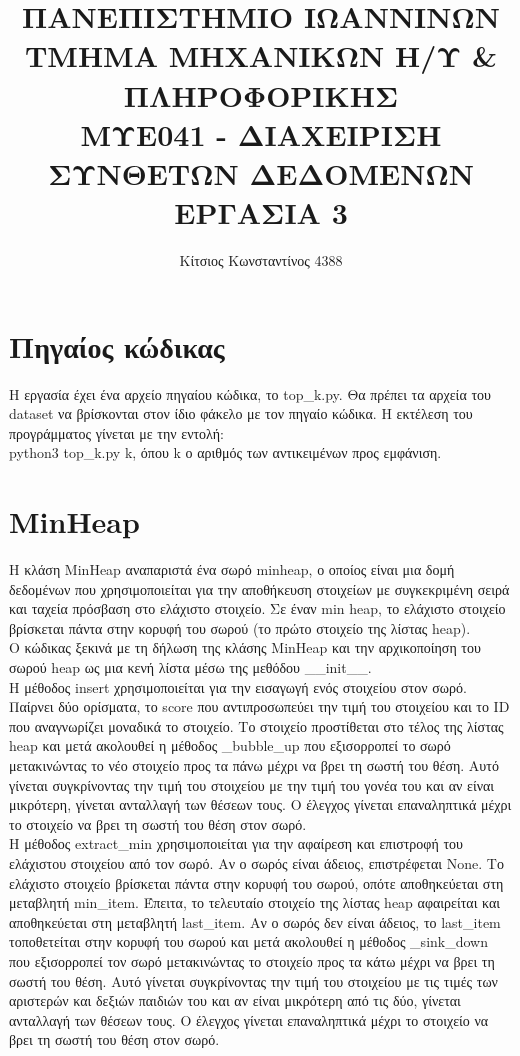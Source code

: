 \documentclass{article}[40pt]
\title{ΠΑΝΕΠΙΣΤΗΜΙΟ ΙΩΑΝΝΙΝΩΝ \\ ΤΜΗΜΑ ΜΗΧΑΝΙΚΩΝ Η/Υ  \&  ΠΛΗΡΟΦΟΡΙΚΗΣ \\  ΜΥΕ041 - ΔΙΑΧΕΙΡΙΣΗ ΣΥΝΘΕΤΩΝ ΔΕΔΟΜΕΝΩΝ \\ ΕΡΓΑΣΙΑ 3}
\author{Κίτσιος Κωνσταντίνος 4388 }
\begin{document}
\maketitle
\newpage
\tableofcontents
\newpage
\section{Πηγαίος κώδικας}
Η εργασία έχει ένα αρχείο πηγαίου κώδικα, το top\_k.py. Θα πρέπει τα αρχεία του dataset να βρίσκονται στον ίδιο φάκελο με τον πηγαίο κώδικα. Η εκτέλεση του προγράμματος γίνεται με την εντολή:\\
python3 top\_k.py k, όπου k ο αριθμός των αντικειμένων προς εμφάνιση.   
\section{MinHeap}
Η κλάση MinHeap αναπαριστά ένα σωρό minheap, ο οποίος είναι μια δομή δεδομένων που χρησιμοποιείται για την αποθήκευση στοιχείων με συγκεκριμένη σειρά και ταχεία πρόσβαση στο ελάχιστο στοιχείο. Σε έναν min heap, το ελάχιστο στοιχείο βρίσκεται πάντα στην κορυφή του σωρού (το πρώτο στοιχείο της λίστας heap).\\
Ο κώδικας ξεκινά με τη δήλωση της κλάσης MinHeap και την αρχικοποίηση του σωρού heap ως μια κενή λίστα μέσω της μεθόδου \_\_init\_\_.\\
Η μέθοδος insert χρησιμοποιείται για την εισαγωγή ενός στοιχείου στον σωρό. Παίρνει δύο ορίσματα, το score που αντιπροσωπεύει την τιμή του στοιχείου και το ID που αναγνωρίζει μοναδικά το στοιχείο. Το στοιχείο προστίθεται στο τέλος της λίστας heap και μετά ακολουθεί η μέθοδος \_bubble\_up που εξισορροπεί το σωρό μετακινώντας το νέο στοιχείο προς τα πάνω μέχρι να βρει τη σωστή του θέση. Αυτό γίνεται συγκρίνοντας την τιμή του στοιχείου με την τιμή του γονέα του και αν είναι μικρότερη, γίνεται ανταλλαγή των θέσεων τους. Ο έλεγχος γίνεται επαναληπτικά μέχρι το στοιχείο να βρει τη σωστή του θέση στον σωρό.\\
Η μέθοδος extract\_min χρησιμοποιείται για την αφαίρεση και επιστροφή του ελάχιστου στοιχείου από τον σωρό. Αν ο σωρός είναι άδειος, επιστρέφεται None. Το ελάχιστο στοιχείο βρίσκεται πάντα στην κορυφή του σωρού, οπότε αποθηκεύεται στη μεταβλητή min\_item. Έπειτα, το τελευταίο στοιχείο της λίστας heap αφαιρείται και αποθηκεύεται στη μεταβλητή last\_item. Αν ο σωρός δεν είναι άδειος, το last\_item τοποθετείται στην κορυφή του σωρού και μετά ακολουθεί η μέθοδος \_sink\_down που εξισορροπεί τον σωρό μετακινώντας το στοιχείο προς τα κάτω μέχρι να βρει τη σωστή του θέση. Αυτό γίνεται συγκρίνοντας την τιμή του στοιχείου με τις τιμές των αριστερών και δεξιών παιδιών του και αν είναι μικρότερη από τις δύο, γίνεται ανταλλαγή των θέσεων τους. Ο έλεγχος γίνεται επαναληπτικά μέχρι το στοιχείο να βρει τη σωστή του θέση στον σωρό.
\newpage
\end{document}
